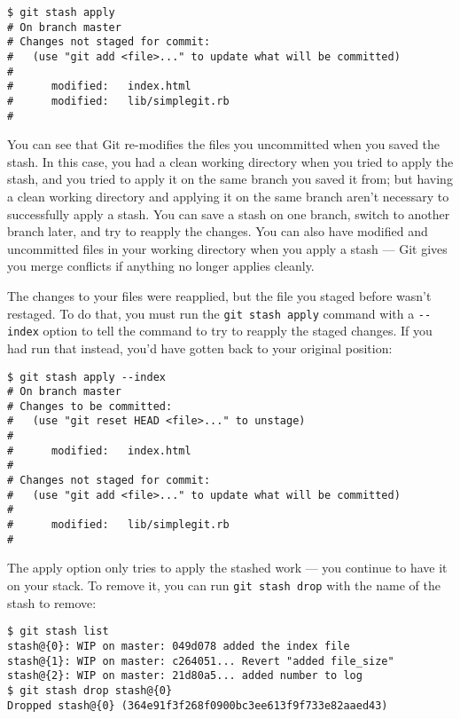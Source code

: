 \documentclass[a4paper]{book}
\begin{document}
\begin{shaded}\begin{verbatim}
$ git stash apply
# On branch master
# Changes not staged for commit:
#   (use "git add <file>..." to update what will be committed)
#
#      modified:   index.html
#      modified:   lib/simplegit.rb
#
\end{verbatim}\end{shaded}

You can see that Git re-modifies the files you uncommitted when you saved the stash. In this case, you had a clean working directory when you tried to apply the stash, and you tried to apply it on the same branch you saved it from; but having a clean working directory and applying it on the same branch aren't necessary to successfully apply a stash. You can save a stash on one branch, switch to another branch later, and try to reapply the changes. You can also have modified and uncommitted files in your working directory when you apply a stash --- Git gives you merge conflicts if anything no longer applies cleanly.

The changes to your files were reapplied, but the file you staged before wasn't restaged. To do that, you must run the \texttt{git stash apply} command with a \texttt{-{}-index} option to tell the command to try to reapply the staged changes. If you had run that instead, you'd have gotten back to your original position:

\begin{shaded}\begin{verbatim}
$ git stash apply --index
# On branch master
# Changes to be committed:
#   (use "git reset HEAD <file>..." to unstage)
#
#      modified:   index.html
#
# Changes not staged for commit:
#   (use "git add <file>..." to update what will be committed)
#
#      modified:   lib/simplegit.rb
#
\end{verbatim}\end{shaded}

The apply option only tries to apply the stashed work --- you continue to have it on your stack. To remove it, you can run \texttt{git stash drop} with the name of the stash to remove:

\begin{shaded}\begin{verbatim}
$ git stash list
stash@{0}: WIP on master: 049d078 added the index file
stash@{1}: WIP on master: c264051... Revert "added file_size"
stash@{2}: WIP on master: 21d80a5... added number to log
$ git stash drop stash@{0}
Dropped stash@{0} (364e91f3f268f0900bc3ee613f9f733e82aaed43)
\end{verbatim}\end{shaded}
\end{document}

